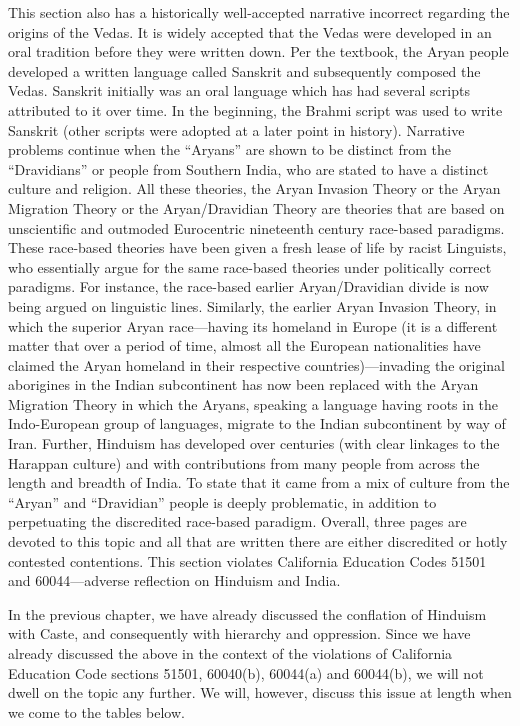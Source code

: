 This section also has a historically well-accepted narrative incorrect regarding the origins of the Vedas. It is widely accepted that the Vedas were developed in an oral tradition before they were written down. Per the textbook, the Aryan people developed a written language called Sanskrit and subsequently composed the Vedas. Sanskrit initially was an oral language which has had several scripts attributed to it over time. In the beginning, the Brahmi script was used to write Sanskrit (other scripts were adopted at a later point in history). Narrative problems continue when the “Aryans” are shown to be distinct from the “Dravidians” or people from Southern India, who are stated to have a distinct culture and religion. All these theories, the Aryan Invasion Theory or the Aryan Migration Theory or the Aryan/Dravidian Theory are theories that are based on unscientific and outmoded Eurocentric nineteenth century race-based paradigms. These race-based theories have been given a fresh lease of life by racist Linguists, who essentially argue for the same race-based theories under politically correct paradigms. For instance, the race-based earlier Aryan/Dravidian divide is now being argued on linguistic lines. Similarly, the earlier Aryan Invasion Theory, in which the superior Aryan race—having its homeland in Europe (it is a different matter that over a period of time, almost all the European nationalities have claimed the Aryan homeland in their respective countries)—invading the original aborigines in the Indian subcontinent has now been replaced with the Aryan Migration Theory in which the Aryans, speaking a language having roots in the Indo-European group of languages, migrate to the Indian subcontinent by way of Iran. Further, Hinduism has developed over centuries (with clear linkages to the Harappan culture) and with contributions from many people from across the length and breadth of India. To state that it came from a mix of culture from the “Aryan” and “Dravidian” people is deeply problematic, in addition to perpetuating the discredited race-based paradigm. Overall, three pages are devoted to this topic and all that are written there are either discredited or hotly contested contentions. This section violates California Education Codes 51501 and 60044—adverse reflection on Hinduism and India.  

In the previous chapter, we have already discussed the conflation of Hinduism with Caste, and consequently with hierarchy and oppression. Since we have already discussed the above in the context of the violations of California Education Code sections 51501, 60040(b), 60044(a) and 60044(b), we will not dwell on the topic any further. We will, however, discuss this issue at length when we come to the tables below.  

